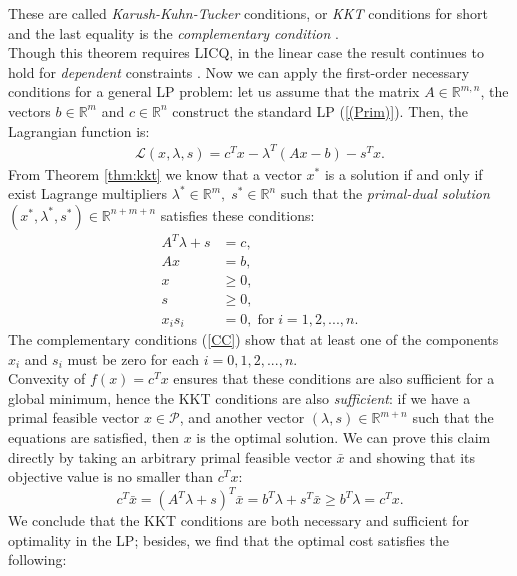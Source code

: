 \documentclass[a4paper,10 pt,titlepage,twoside]{book}
\theoremstyle{plain}
\theoremstyle{definition}
\theoremstyle{remark}
\begin{document}
These are called \textit{Karush-Kuhn-Tucker} conditions, or \textit{KKT} conditions for short and the last equality is the \textit{complementary condition} \cite{W}.\\ Though this theorem requires LICQ, in the linear case the result continues to hold for \textit{dependent} constraints \cite{W}. Now we can apply the first-order necessary conditions for a general LP problem: let us assume that the matrix $A\in\mathbb{R}^{m,n}$, the vectors $b\in\mathbb{R}^{m}$ and $c\in\mathbb{R}^{n}$ construct the standard LP (\ref{(Prim)}). Then, the Lagrangian function is:\\
\begin{align}\label{Lagrangian}
\mathcal{L}(x,\lambda,s)=c^{T}x-\lambda^{T}\left(Ax-b\right)-s^{T}x.
\end{align}
From Theorem \ref{thm:kkt} we know that a vector $x^{*}$ is a solution if and only if exist Lagrange multipliers $\lambda^{*}\in\mathbb{R}^{m},\;s^{*}\in\mathbb{R}^{n}$ such that the \textit{primal-dual solution} $\left( x^{*},\lambda^{*},s^{*}\right)\in\mathbb{R}^{n+m+n}$ satisfies these conditions: 
\begin{align*}
A^{T}\lambda+s&=c,\tag{2.6a}\label{DF}\\ 
Ax&=b,\tag{2.6b}\label{PF}\\ 
x&\geq 0,\tag{2.6c}\\
s&\geq 0,\tag{2.6d}\\
x_{i}s_{i}&=0,\; \text{for}\;i= 1,2,...,n.\label{CC} \tag{2.6e}
\end{align*} 
The complementary conditions (\ref{CC}) show that at least one of the components $x_{i}$ and $s_{i}$ must be zero for each $i=0,1,2,...,n$.\\
 Convexity of $f(x)= c^{T}x$ ensures that these conditions are also sufficient for a global minimum, hence the KKT conditions are also \textit{sufficient}: if we have a primal feasible vector $x\in\mathcal{P}$, and another vector $(\lambda, s)\in\mathbb{R}^{m+n}$ such that the equations are satisfied, then $x$ is the optimal solution. We can prove this claim directly by taking an arbitrary primal feasible vector $\bar{x}$ and showing that its objective value is no smaller than $c^{T}x$:
\begin{equation*}
c^{T}\bar{x}=(A^{T}\lambda+s)^{T}\bar{x}=b^{T}\lambda+s^{T}\bar{x}\geq b^{T}\lambda= c^{T}x.
\end{equation*}
We conclude that the KKT conditions are both necessary and sufficient for optimality in the LP; besides, we find that the optimal cost satisfies the following:
\end{document}
